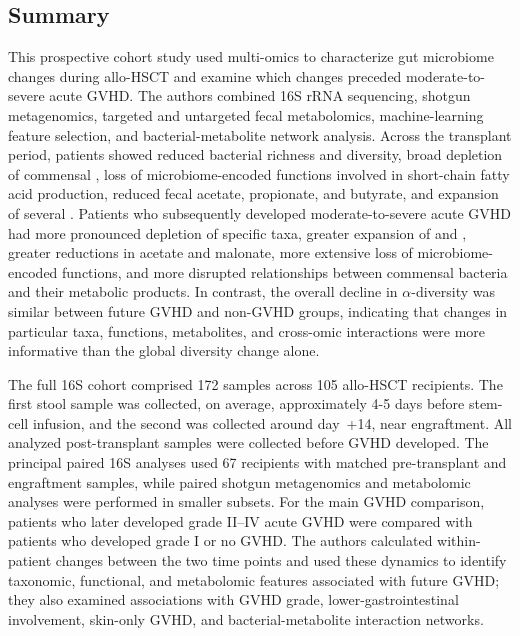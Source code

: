 \subsection{Summary}
This prospective cohort study used multi-omics to characterize gut microbiome changes during allo-HSCT and examine which changes preceded moderate-to-severe acute GVHD. The authors combined 16S rRNA sequencing, shotgun metagenomics, targeted and untargeted fecal metabolomics, machine-learning feature selection, and bacterial-metabolite network analysis. Across the transplant period, patients showed reduced bacterial richness and diversity, broad depletion of commensal \taxClostridiales, loss of microbiome-encoded functions involved in short-chain fatty acid production, reduced fecal acetate, propionate, and butyrate, and expansion of several \taxStaphylococcusSpecies. Patients who subsequently developed moderate-to-severe acute GVHD had more pronounced depletion of specific \taxClostridiales taxa, greater expansion of \taxEnterococcusFaecium and \taxParabacteroides, greater reductions in acetate and malonate, more extensive loss of microbiome-encoded functions, and more disrupted relationships between commensal bacteria and their metabolic products. In contrast, the overall decline in $\alpha$-diversity was similar between future GVHD and non-GVHD groups, indicating that changes in particular taxa, functions, metabolites, and cross-omic interactions were more informative than the global diversity change alone.
\par

The full 16S cohort comprised 172 samples across 105 allo-HSCT recipients. The first stool sample was collected, on average, approximately 4-5 days before stem-cell infusion, and the second was collected around day~+14, near engraftment. All analyzed post-transplant samples were collected before GVHD developed. The principal paired 16S analyses used 67 recipients with matched pre-transplant and engraftment samples, while paired shotgun metagenomics and metabolomic analyses were performed in smaller subsets. For the main GVHD comparison, patients who later developed grade II--IV acute GVHD were compared with patients who developed grade I or no GVHD. The authors calculated within-patient changes between the two time points and used these dynamics to identify taxonomic, functional, and metabolomic features associated with future GVHD; they also examined associations with GVHD grade, lower-gastrointestinal involvement, skin-only GVHD, and bacterial-metabolite interaction networks.
\par

